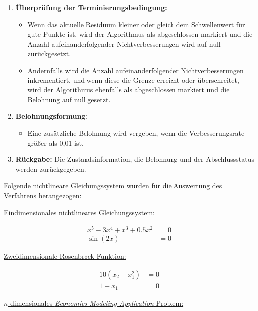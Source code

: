 \documentclass{article}
\theoremstyle{newline}
\begin{document}
\begin{onehalfspace}
\begin{enumerate}
	\item \textbf{Überprüfung der Terminierungsbedingung:}
	\begin{itemize}
		\item Wenn das aktuelle Residuum kleiner oder gleich dem Schwellenwert für gute Punkte ist, wird der Algorithmus als abgeschlossen markiert und die Anzahl aufeinanderfolgender Nichtverbesserungen wird auf null zurückgesetzt.
		\item Andernfalls wird die Anzahl aufeinanderfolgender Nichtverbesserungen inkrementiert, und wenn diese die Grenze erreicht oder überschreitet, wird der Algorithmus ebenfalls als abgeschlossen markiert und die Belohnung auf null gesetzt.
	\end{itemize}
	
	\item \textbf{Belohnungsformung:}
	\begin{itemize}
		\item Eine zusätzliche Belohnung wird vergeben, wenn die Verbesserungsrate größer als 0,01 ist.
	\end{itemize}
	
	\item \textbf{Rückgabe:}
	Die Zustandsinformation, die Belohnung und der Abschlussstatus werden zurückgegeben.
\end{enumerate}

Folgende nichtlineare Gleichungssystem wurden für die Auswertung des Verfahrens herangezogen:
\smallskip

\underline{Eindimensionales nichtlineares Gleichungssystem:}

\begin{subequations}\label{nse:1}
	\begin{align}
		x^5 - 3x^4+x^3+0.5x^2 &= 0\\
		\sin(2x) &= 0
	\end{align}
\end{subequations}

\underline{Zweidimensionale Rosenbrock-Funktion:}

\begin{subequations}\label{nse:rosenbrock}
	\begin{align}
		10(x_2 - x_1^2) &= 0\\
		1 - x_1 &=0
	\end{align}
\end{subequations}

\underline{$n$-dimensionales \textit{Economics Modeling Application}-Problem:} 


\end{onehalfspace}
\end{document}

